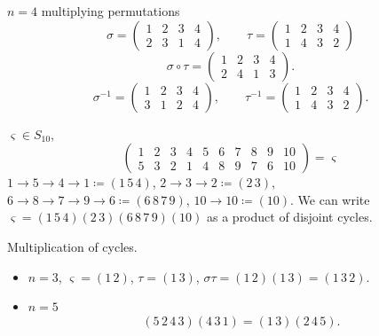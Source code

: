 \documentclass[10pt, a4paper]{article}
\begin{document}
\begin{example}
    $n = 4$ multiplying permutations
    \[
    \sigma = \begin{pmatrix}
        1 & 2 & 3 & 4 \\ 2 & 3 & 1 & 4
    \end{pmatrix},\qquad \tau = \begin{pmatrix}
        1 & 2 & 3 & 4 \\ 1 & 4 & 3 & 2
    \end{pmatrix}
    \]
    \[
    \sigma \circ \tau = \begin{pmatrix}
        1 & 2 & 3 & 4 \\
        2 & 4 & 1 & 3
    \end{pmatrix}.
    \]
    \[
    \sigma ^ {-1} = \begin{pmatrix}
        1 & 2 & 3 & 4 \\
        3 & 1 & 2 & 4
    \end{pmatrix},\qquad \tau ^ {-1} = \begin{pmatrix}
        1 & 2 & 3 & 4 \\
        1 & 4 & 3 & 2
    \end{pmatrix}.
    \]
\end{example}

\begin{example}
    $\varsigma \in S_{10}$,
    \[
    \begin{pmatrix}
        1 & 2 & 3 & 4 & 5 & 6 & 7 & 8 & 9 & 10 \\
        5 & 3 & 2 & 1 & 4 & 8 & 9 & 7 & 6 & 10
    \end{pmatrix} = \varsigma
    \]
    $1 \to 5 \to 4 \to 1 \coloneqq (1\, 5\, 4)$,
    $2 \to 3 \to 2 \coloneqq (2\, 3)$,
    $6 \to 8 \to 7 \to 9 \to 6 \coloneqq (6\, 8\, 7\, 9)$,
    $10 \to 10 \coloneqq (10)$.
    We can write $\varsigma = (1\, 5\, 4)(2\, 3)(6\, 8\, 7\, 9)(10)$ as a product of disjoint cycles.
\end{example}

\begin{example}
    Multiplication of cycles.
    \begin{itemize}
        \item $n = 3$,
        $\varsigma = (1\,2)$,
        $\tau = (1\,3)$,
        $\sigma \tau = (1\,2)(1\,3) = (1\, 3\, 2)$.

        \item $n = 5$
        \[
        (5\, 2\, 4\, 3)(4\, 3\, 1) = (1\, 3)(2\, 4\, 5).
        \]
    \end{itemize}
\end{example}
\end{document}
